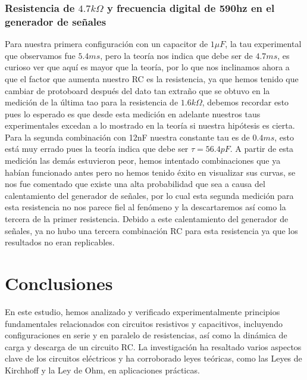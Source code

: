 \documentclass[article,12pt]{elsarticle}
\begin{document}
\subsubsection{Resistencia de $4.7k\Omega$ y frecuencia digital de 590hz en el generador de señales}
Para nuestra primera configuración con un capacitor de $1\mu F$, la tau experimental que observamos fue $5.4ms$, pero la teoría nos indica que debe ser de $4.7ms$, es curioso ver que aquí es mayor que la teoría, por lo que nos inclinamos ahora a que el factor que aumenta nuestro RC es la resistencia, ya que hemos tenido que cambiar de protoboard después del dato tan extraño que se obtuvo en la medición de la última tao para la resistencia de $1.6 k\Omega$, debemos recordar esto pues lo esperado es que desde esta medición en adelante nuestros taus experimentales excedan a lo mostrado en la teoría si nuestra hipótesis es cierta.
Para la segunda combinación con 12nF nuestra constante tau es de $0.4ms$, esto está muy errado pues la teoría indica que debe ser $\tau = 56.4pF$.
A partir de esta medición las demás estuvieron peor, hemos intentado combinaciones que ya habían funcionado antes pero no hemos tenido éxito en visualizar sus curvas, se nos fue comentado que existe una alta probabilidad que sea a causa del calentamiento del generador de señales, por lo cual esta segunda medición para esta resistencia no nos parece fiel al fenómeno y la descartaremos así como la tercera de la primer resistencia. Debido a este calentamiento del generador de señales, ya no hubo una tercera combinación RC para esta resistencia ya que los resultados no eran replicables.


\section{Conclusiones}

En este estudio, hemos analizado y verificado experimentalmente principios fundamentales relacionados con circuitos resistivos y capacitivos, incluyendo configuraciones en serie y en paralelo de resistencias, así como la dinámica de carga y descarga de un circuito RC. La investigación ha resaltado varios aspectos clave de los circuitos eléctricos y ha corroborado leyes teóricas, como las Leyes de Kirchhoff y la Ley de Ohm, en aplicaciones prácticas.
\end{document}
